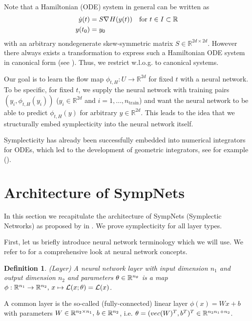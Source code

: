\documentclass[twoside,a4paper]{article}
\newtheorem{definition}{Definition}
\begin{document}
Note that a Hamiltonian (ODE) system in general can be written as
\begin{align*}
	\dot{y}(t) &= S \nabla_{}{H}(y(t)) \quad \text{for } t \in I \subset \mathbb{R} \\
	y(t_0) &= y_0
\end{align*}
with an arbitrary nondegenerate skew-symmetric matrix $S \in \mathbb{R}^{2d \times 2d}$.
However there always exists a transformation to express such a Hamiltonian ODE system in
canonical form (see \citet[Remark 3.8]{peng2016}). Thus, we restrict w.l.o.g.
to canonical systems.

Our goal is to learn the flow map $\phi_{t,H} : U \to \mathbb{R}^{2d}$ for fixed $t$ with a neural network.
To be specific, for fixed $t$, we supply the neural network with training pairs $(y_i, \phi_{t,H}(y_i))$
($y_i \in \mathbb{R}^{2d}$ and $i=1, \dots, n_{\text{train}}$) and want the neural network
to be able to predict $\phi_{t,H}(y)$ for arbitrary $y \in \mathbb{R}^{2d}$.
This leads to the idea that we structurally embed symplecticity into the neural network itself.

Symplecticity has already been successfully embedded into numerical integrators for ODEs, which
led to the development of geometric integrators, see for example \citeauthor{hairer2006}
(\cite{hairer2006}).

\section{Architecture of SympNets}\label{sec_architecture_of_sympnets}

In this section we recapitulate the architecture of SympNets (Symplectic Networks) as
proposed by \citeauthor{Jin2020} in \cite{Jin2020}. We prove
symplecticity for all layer types.

First, let us briefly introduce neural network terminology which we will use.
We refer to \cite{Goodfellow2016} for a comprehensive look at neural
network concepts.

\begin{definition}
	(Layer)
	A neural network layer with input dimension $n_1$ and output dimension $n_2$
	and parameters $\theta \in \mathbb{R}^{n_\theta}$ is a map 
	$\phi : \mathbb{R}^{n_1} \to \mathbb{R}^{n_2},\, x \mapsto \mathcal{L}(x;\theta) = \mathcal{L}(x)$.
\end{definition}

A common layer is the so-called (fully-connected) linear layer
$\phi(x) = Wx +b$ with parameters $W \in \mathbb{R}^{n_2 \times n_1},\, b \in \mathbb{R}^{n_2}$,
i.e. $\theta = (vec(W)^T, b^T)^T \in \mathbb{R}^{n_2 n_1 + n_2}$.
\end{document}
